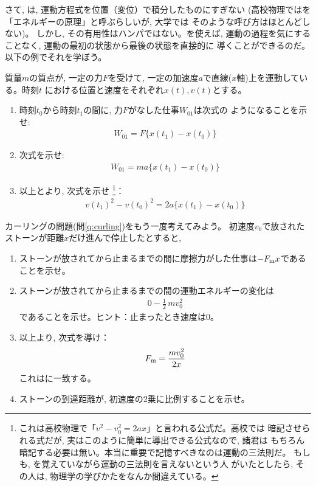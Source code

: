 さて, は, 運動方程式を位置（変位）で積分したものにすぎない
(高校物理ではを「エネルギーの原理」と呼ぶらしいが, 大学では
そのような呼び方はほとんどしない)。
しかし, その有用性はハンパではない。を使えば, 
運動の過程を気にすることなく, 運動の最初の状態から最後の状態を直接的に
導くことができるのだ。以下の例でそれを学ぼう。\mv


%
\begin{q}\label{q:accel_energy}
質量$m$の質点が, 一定の力$F$を受けて, 一定の加速度$a$で直線($x$軸)上を運動している。時刻$t$
における位置と速度をそれぞれ$x(t), v(t)$とする。
\begin{enumerate}
\item 時刻$t_0$から時刻$t_1$の間に, 力$F$がなした仕事$W_{01}$は次式の
ようになることを示せ:
\begin{eqnarray}
W_{01}=F\{x(t_1)-x(t_0)\}
\end{eqnarray}
\item 次式を示せ:
\begin{eqnarray}
W_{01}=ma\{x(t_1)-x(t_0)\}
\end{eqnarray}
\item 以上とより, 次式を示せ
\footnote{これは高校物理で「$v^2-v_0^2=2ax$」と言われる公式だ。高校では
暗記させられる式だが, 実はこのように簡単に導出できる公式なので, 諸君は
もちろん暗記する必要は無い。本当に重要で記憶すべきなのは運動の三法則だ。
もしも, を覚えていながら運動の三法則を言えないという人
がいたとしたら, その人は, 物理学の学びかたをなんか間違えている。}：
\begin{eqnarray}
v(t_1)^2-v(t_0)^2=2a\{x(t_1)-x(t_0)\}\label{eq:v2_dist}
\end{eqnarray}
\end{enumerate}
\end{q}
\vspace{0.4cm}

%
\begin{q}\label{q:curling2}
カーリングの問題(問\ref{q:curling})をもう一度考えてみよう。
初速度$v_0$で放されたストーンが距離$x$だけ進んで停止したとすると, 
\begin{enumerate}
\item ストーンが放されてから止まるまでの間に摩擦力がした仕事は$-F_{\text m}x$であることを示せ。
\item ストーンが放されてから止まるまでの間の運動エネルギーの変化は
\begin{eqnarray}0-\frac{1}{2}\,mv_0^2\end{eqnarray}
であることを示せ。ヒント：止まったとき速度は0。
\item 以上より, 次式を導け：
\begin{eqnarray}F_{\text m}=\frac{mv_0^2}{2x}\end{eqnarray}
これはに一致する。
\item ストーンの到達距離が, 初速度の2乗に比例することを示せ。
\end{enumerate}
\end{q}
\vspace{0.4cm}

